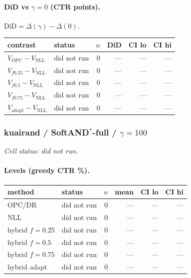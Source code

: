 \documentclass[10pt,a4paper]{article}
\begin{document}
\paragraph{DiD vs $\gamma=0$ (CTR points).} $\mathrm{DiD}=\Delta(\gamma)-\Delta(0)$.
{\centering\small\begin{tabular}{llrrrr}
\toprule contrast & status & $n$ & DiD & CI lo & CI hi \\
\midrule
$V_{\mathrm{OPC}}-V_{\mathrm{NLL}}$ & did not run & 0 & --- & --- & --- \\
$V_{f0.25}-V_{\mathrm{NLL}}$ & did not run & 0 & --- & --- & --- \\
$V_{f0.5}-V_{\mathrm{NLL}}$ & did not run & 0 & --- & --- & --- \\
$V_{f0.75}-V_{\mathrm{NLL}}$ & did not run & 0 & --- & --- & --- \\
$V_{\mathrm{adapt}}-V_{\mathrm{NLL}}$ & did not run & 0 & --- & --- & --- \\
\bottomrule\end{tabular}\par}
\bigskip
\subsubsection{kuairand / SoftAND$^*$-full / $\gamma=100$}
\emph{Cell status: did not run}.
\paragraph{Levels (greedy CTR \%).}
{\centering\small\begin{tabular}{llrrrr}
\toprule method & status & $n$ & mean & CI lo & CI hi \\
\midrule
OPC/DR & did not run & 0 & --- & --- & --- \\
NLL & did not run & 0 & --- & --- & --- \\
hybrid $f{=}0.25$ & did not run & 0 & --- & --- & --- \\
hybrid $f{=}0.5$ & did not run & 0 & --- & --- & --- \\
hybrid $f{=}0.75$ & did not run & 0 & --- & --- & --- \\
hybrid adapt & did not run & 0 & --- & --- & --- \\
\bottomrule\end{tabular}\par}
\end{document}
